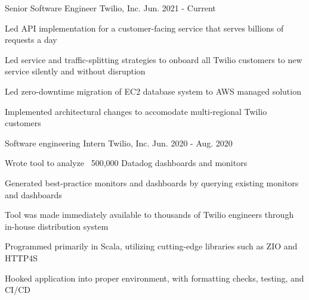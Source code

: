 

\begin{cventries}


  \cventry
    {Senior Software Engineer} %
    {Twilio, Inc.} %
    {} %
    {Jun. 2021 - Current} %
    {
      \begin{cvitems} %
      \item {Led API implementation for a customer-facing service that serves billions of requests a day}
      \item {Led service and traffic-splitting strategies to onboard all Twilio customers to new service silently and without disruption}
      \item {Led zero-downtime migration of EC2 database system to AWS managed solution}
      \item {Implemented architectural changes to accomodate multi-regional Twilio customers}
      \end{cvitems}
    }

  \cventry
    {Software engineering Intern} %
    {Twilio, Inc.} %
    {} %
    {Jun. 2020 - Aug. 2020} %
    {
      \begin{cvitems} %
        \item {Wrote tool to analyze ~500,000 Datadog dashboards and monitors}
        \item {Generated best-practice monitors and dashboards by querying existing monitors and dashboards}
        \item {Tool was made immediately available to thousands of Twilio engineers through in-house distribution system}
        \item {Programmed primarily in Scala, utilizing cutting-edge libraries such as ZIO and HTTP4S}
        \item {Hooked application into proper environment, with formatting checks, testing, and CI/CD}
        \end{cvitems}
    }


\end{cventries}
